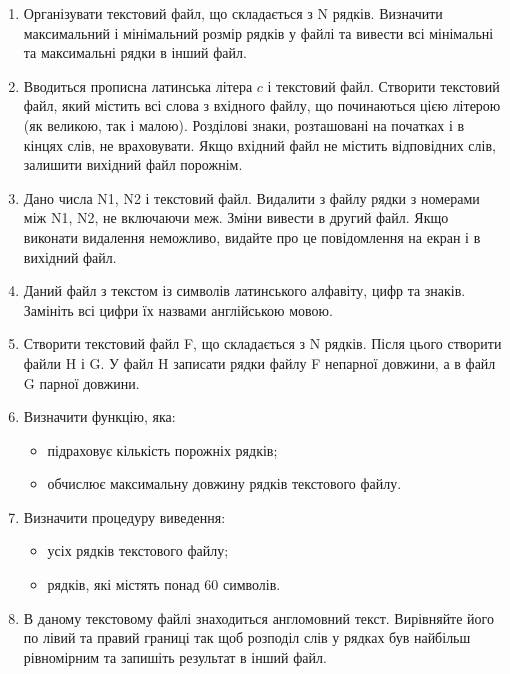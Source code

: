 \documentclass[a5paper,titlepage,openany,twoside,
]
{book_unv}%
\begin{document}
\begin{enumerate}
\def\labelenumi{\arabic{enumi})}
\setcounter{enumi}{17}

\item
  Організувати текстовий файл, що складається з N рядків. Визначити
  максимальний і мінімальний розмір рядків у файлі та вивести всі мінімальні та
максимальні рядки в інший файл.

\item
  Вводиться прописна латинська літера $c$ і текстовий файл. Створити
  текстовий файл, який містить всі слова з вхідного файлу, що
  починаються цією літерою (як великою, так і малою). Розділові знаки,
  розташовані на початках і в кінцях слів, не враховувати. Якщо вхідний
  файл не містить відповідних слів, залишити вихідний файл порожнім.

\item
  Дано числа N1, N2 і текстовий файл. Видалити з файлу рядки з номерами
  між N1, N2, не включаючи меж. Зміни вивести в другий файл. Якщо
  виконати видалення неможливо, видайте про це повідомлення на екран і в
  вихідний файл.
\item
  Даний файл з текстом із символів латинського алфавіту, цифр та знаків.
  Замініть всі цифри їх назвами англійською мовою.
\item
  Створити текстовий файл F, що складається з N рядків. Після цього
  створити файли H і G. У файл H записати рядки файлу F непарної
  довжини, а в файл G парної довжини.

\item
 Визначити функцію, яка:
\begin{itemize}
\item підраховує кількість порожніх рядків;
\item обчислює максимальну довжину рядків текстового файлу.
\end{itemize}

\item Визначити процедуру виведення:
\begin{itemize}
\item усіх рядків текстового файлу;
\item рядків, які містять понад 60 символів.
\end{itemize}

\item
В даному текстовому файлі знаходиться англомовний текст. Вирівняйте
його по лівий та правий границі так щоб розподіл слів у рядках був
найбільш рівномірним та запишіть результат в інший файл.


\end{enumerate}
\end{document}
